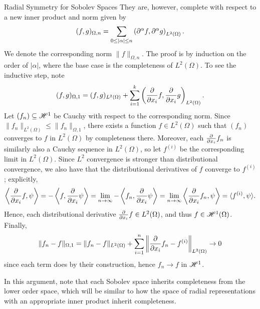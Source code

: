 \begin{chapter}{Radial Symmetry for Sobolev Spaces}
They are, however, complete with respect to a new inner product and norm given by 
\begin{equation}
  (f,g)_{\Omega,n} = \sum_{0\le |\alpha| \le n} \left( \partial^\alpha f, \partial^\alpha g\right)_{L^2(\Omega)}.
\end{equation}
We denote the corresponding norm $\|f\|_{\Omega,n}$.
The proof is by induction on the order of $|\alpha|$, where the base case is the completeness of $L^2(\Omega)$.
To see the inductive step, note
\begin{equation}
  (f,g)_{\Omega,1} = (f,g)_{L^2(\Omega)} + \sum_{i=1}^k \left( \frac{\partial}{\partial x_i} f, \frac{\partial}{\partial x_i} g\right)_{L^2(\Omega)}.
\end{equation}
 Let $(f_n) \subseteq \mathscr H^1$ be Cauchy with respect to the corresponding norm. 
Since $\| f_n \|_{L^2(\Omega)} \le \|f_n\|_{\Omega,1}$, there exists a function $f \in L^2(\Omega)$ such that $(f_n)$ converges to $f$ in $L^2(\Omega)$ by completeness there.
Moreover, each $\frac{\partial}{\partial x_i} f_n$ is similarly also a Cauchy sequence in $L^2(\Omega)$, so let $f^{(i)}$ be the corresponding limit in $L^2(\Omega)$.
Since $L^2$ convergence is stronger than distributional convergence, we also have that the distributional derivatives of $f$ converge to $f^{(i)}$; explicitly,
\begin{equation}
  \left\langle \frac{\partial}{\partial x_i} f, \psi \right\rangle = -\left\langle f, \frac{\partial}{\partial x_i}\psi \right\rangle = \lim_{n\to\infty}-\left\langle f_n, \frac{\partial}{\partial x_i}\psi \right\rangle = \lim_{n\to\infty}\left\langle \frac{\partial}{\partial x_i}f_n, \psi \right\rangle = \langle f^{(i)},\psi \rangle.
\end{equation}
Hence, each distributional derivative $\frac{\partial}{\partial x_i} f \in L^2(\Omega)$, and thus $f \in \mathscr H^1(\Omega)$.
Finally, 
\begin{equation}
  \|f_n - f\|_{\Omega,1} = \|f_n - f\|_{L^2(\Omega)} + \sum_{i=1}^n \left\|\frac{\partial}{\partial x_i} f_n - f^{(i)}\right\|_{L^2(\Omega)} \to 0
\end{equation}
since each term does by their construction, hence $f_n \to f$ in $\mathscr H^1$.

In this argument, note that each Sobolev space inherits completeness from the lower order space, which will be similar to how the space of radial representations with an appropriate inner product inherit completeness.


\end{chapter}
